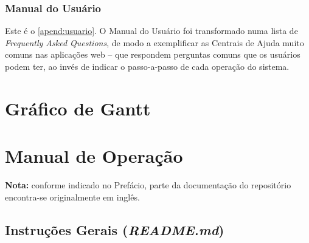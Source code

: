 \documentclass[12pt,a4paper,twoside,hyphens,english,brazil]{abntex2}
\begin{document}
{\subsection{Manual do Usuário}
Este é o \autoref{apend:usuario}. O Manual do Usuário foi transformado numa lista de \emph{Frequently Asked Questions}, de modo a exemplificar as Centrais de Ajuda muito comuns nas aplicações web -- que respondem perguntas comuns que os usuários podem ter, ao invés de indicar o passo-a-passo de cada operação do sistema.

\postextual

\apendices

\chapter{Gráfico de Gantt} \label{apend:gantt}


\chapter{Manual de Operação} \label{apend:operacao}

\begin{framed}
	\noindent
	\textbf{Nota:} conforme indicado no Prefácio, parte da documentação do repositório encontra-se originalmente em inglês.
\end{framed}

\section{Instruções Gerais (\emph{README.md})}

\begin{otherlanguage}{english}

\end{otherlanguage}}
\end{document}
